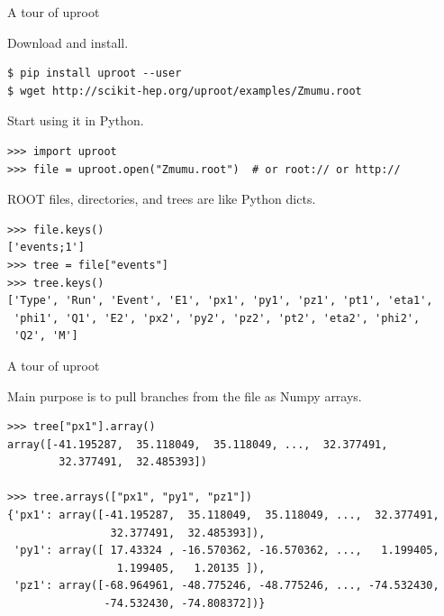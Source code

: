 \documentclass[aspectratio=169]{beamer}
\begin{document}
\begin{frame}[fragile]{A tour of uproot}
\vspace{0.35 cm}
\small

{\normalsize Download and install.}

\begin{verbatim}
$ pip install uproot --user
$ wget http://scikit-hep.org/uproot/examples/Zmumu.root
\end{verbatim}

\vspace{0.2 cm}
{\normalsize Start using it in Python.}

\begin{verbatim}
>>> import uproot
>>> file = uproot.open("Zmumu.root")  # or root:// or http://
\end{verbatim}

\vspace{0.2 cm}
{\normalsize ROOT files, directories, and trees are like Python dicts.}

\begin{verbatim}
>>> file.keys()
['events;1']
>>> tree = file["events"]
>>> tree.keys()
['Type', 'Run', 'Event', 'E1', 'px1', 'py1', 'pz1', 'pt1', 'eta1',
 'phi1', 'Q1', 'E2', 'px2', 'py2', 'pz2', 'pt2', 'eta2', 'phi2',
 'Q2', 'M']
\end{verbatim}
\end{frame}

\begin{frame}[fragile]{A tour of uproot}
\vspace{0.5 cm}
\small

{\normalsize Main purpose is to pull branches from the file as Numpy arrays.}

\begin{verbatim}
>>> tree["px1"].array()
array([-41.195287,  35.118049,  35.118049, ...,  32.377491,
        32.377491,  32.485393])

>>> tree.arrays(["px1", "py1", "pz1"])
{'px1': array([-41.195287,  35.118049,  35.118049, ...,  32.377491,
                32.377491,  32.485393]),
 'py1': array([ 17.43324 , -16.570362, -16.570362, ...,   1.199405,
                 1.199405,   1.20135 ]),
 'pz1': array([-68.964961, -48.775246, -48.775246, ..., -74.532430,
               -74.532430, -74.808372])}
\end{verbatim}
\end{frame}
\end{document}
